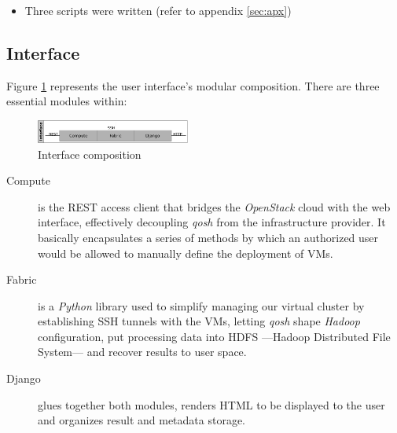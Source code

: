 \documentclass{sig-alternate}
\begin{document}
\begin{itemize}
   
 \item Three scripts were written (refer to appendix \ref{sec:apx})
   
\end{itemize}



\subsection{Interface}
\noindent Figure \ref{fig:interface} represents the user interface's modular composition. There are three essential modules within:

\begin{figure}[tbp]
\centering
\includegraphics[width=0.45\textwidth]{img/003}
\caption{Interface composition}
\label{fig:interface}
\end{figure}

\begin{description}
 \item[Compute] is the REST access client that bridges the \emph{OpenStack} cloud with the web interface, effectively decoupling \emph{qosh} from the infrastructure provider. It basically encapsulates a series of methods by which an authorized user would be allowed to manually define the deployment of VMs.
 \item[Fabric] is a \emph{Python} library used to simplify managing our virtual cluster by establishing SSH tunnels with the VMs, letting \emph{qosh} shape \emph{Hadoop} configuration, put processing data into HDFS ---Hadoop Distributed File System--- and recover results to user space.
 \item[Django] glues together both modules, renders HTML to be displayed to the user and organizes result and metadata storage.
\end{description}
\end{document}
